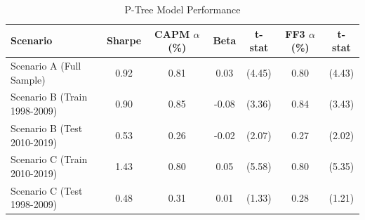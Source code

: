 \begin{table}[!ht]
\centering
\caption{P-Tree Model Performance}
\label{tab:performance}
\begin{tabular}{l c c c c c c}
\hline
Scenario & Sharpe & CAPM $\alpha$ (\%) & Beta & t-stat & FF3 $\alpha$ (\%) & t-stat \\
\hline
Scenario A (Full Sample) & 0.92 & 0.81 & 0.03 & (4.45) & 0.80 & (4.43) \\
Scenario B (Train 1998-2009) & 0.90 & 0.85 & -0.08 & (3.36) & 0.84 & (3.43) \\
Scenario B (Test 2010-2019) & 0.53 & 0.26 & -0.02 & (2.07) & 0.27 & (2.02) \\
Scenario C (Train 2010-2019) & 1.43 & 0.80 & 0.05 & (5.58) & 0.80 & (5.35) \\
Scenario C (Test 1998-2009) & 0.48 & 0.31 & 0.01 & (1.33) & 0.28 & (1.21) \\
\hline
\end{tabular}
\end{table}
